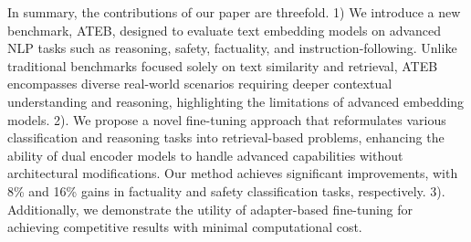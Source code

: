 In summary, the contributions of our paper are threefold. 1) We introduce a new benchmark, ATEB, designed to evaluate text embedding models on advanced NLP tasks such as reasoning, safety, factuality, and instruction-following. Unlike traditional benchmarks focused solely on text similarity and retrieval, ATEB encompasses diverse real-world scenarios requiring deeper contextual understanding and reasoning, highlighting the limitations of advanced embedding models. 2). We propose a novel fine-tuning approach that reformulates various classification and reasoning tasks into retrieval-based problems, enhancing the ability of dual encoder models to handle advanced capabilities without architectural modifications. Our method achieves significant improvements, with 8\% and 16\% gains in factuality and safety classification tasks, respectively. 3). Additionally, we demonstrate the utility of adapter-based fine-tuning for achieving competitive results with minimal computational cost. 